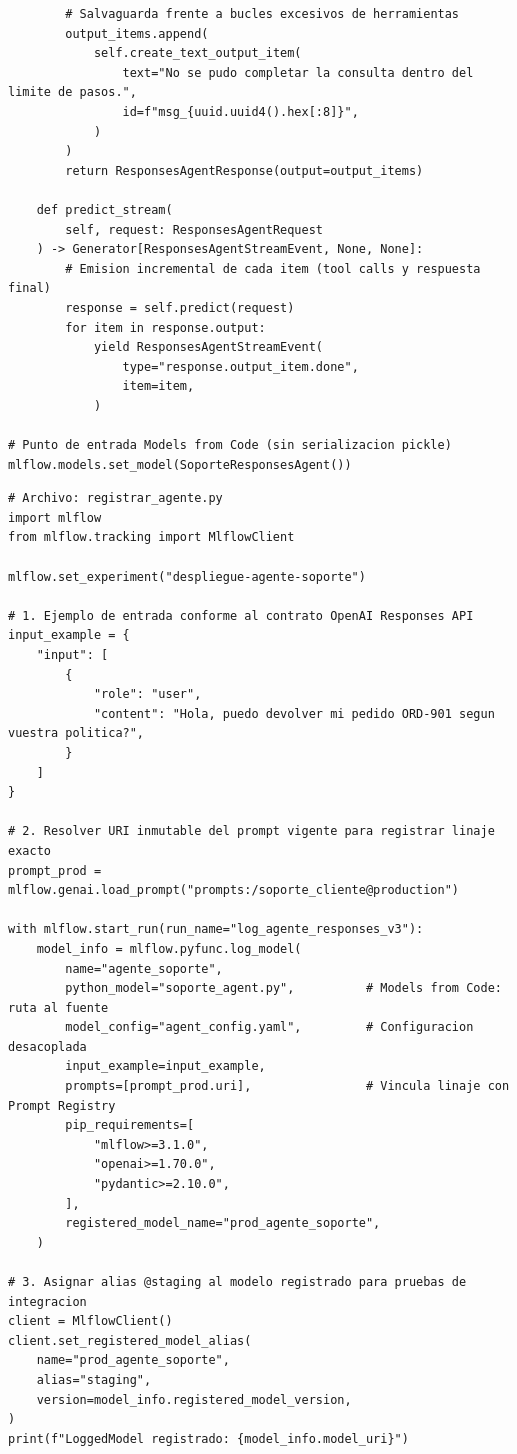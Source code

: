 \begin{lstlisting}
        # Salvaguarda frente a bucles excesivos de herramientas
        output_items.append(
            self.create_text_output_item(
                text="No se pudo completar la consulta dentro del limite de pasos.",
                id=f"msg_{uuid.uuid4().hex[:8]}",
            )
        )
        return ResponsesAgentResponse(output=output_items)

    def predict_stream(
        self, request: ResponsesAgentRequest
    ) -> Generator[ResponsesAgentStreamEvent, None, None]:
        # Emision incremental de cada item (tool calls y respuesta final)
        response = self.predict(request)
        for item in response.output:
            yield ResponsesAgentStreamEvent(
                type="response.output_item.done",
                item=item,
            )

# Punto de entrada Models from Code (sin serializacion pickle)
mlflow.models.set_model(SoporteResponsesAgent())
\end{lstlisting}

\begin{lstlisting}[style=python, caption={Empaquetado y registro del agente mediante \textit{Models from Code} como \code{LoggedModel} con linaje hacia el Prompt Registry (\code{registrar\_agente.py}).}, label={lst:log-agent-from-code}]
# Archivo: registrar_agente.py
import mlflow
from mlflow.tracking import MlflowClient

mlflow.set_experiment("despliegue-agente-soporte")

# 1. Ejemplo de entrada conforme al contrato OpenAI Responses API
input_example = {
    "input": [
        {
            "role": "user",
            "content": "Hola, puedo devolver mi pedido ORD-901 segun vuestra politica?",
        }
    ]
}

# 2. Resolver URI inmutable del prompt vigente para registrar linaje exacto
prompt_prod = mlflow.genai.load_prompt("prompts:/soporte_cliente@production")

with mlflow.start_run(run_name="log_agente_responses_v3"):
    model_info = mlflow.pyfunc.log_model(
        name="agente_soporte",
        python_model="soporte_agent.py",          # Models from Code: ruta al fuente
        model_config="agent_config.yaml",         # Configuracion desacoplada
        input_example=input_example,
        prompts=[prompt_prod.uri],                # Vincula linaje con Prompt Registry
        pip_requirements=[
            "mlflow>=3.1.0",
            "openai>=1.70.0",
            "pydantic>=2.10.0",
        ],
        registered_model_name="prod_agente_soporte",
    )

# 3. Asignar alias @staging al modelo registrado para pruebas de integracion
client = MlflowClient()
client.set_registered_model_alias(
    name="prod_agente_soporte",
    alias="staging",
    version=model_info.registered_model_version,
)
print(f"LoggedModel registrado: {model_info.model_uri}")
\end{lstlisting}

